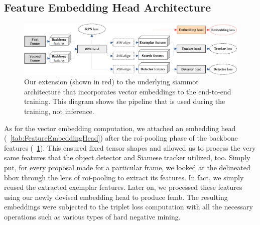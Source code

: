 \subsection{Feature Embedding Head Architecture}

\begin{figure}[!t]
    \centering
    \includegraphics[width=\linewidth]{figures/siamese_tracking/siammot_feature_emb_training.pdf}
    \caption[Embedding-enhanced \gls{siammot} architecture]{Our extension (shown in red) to the underlying \gls{siammot} architecture that incorporates vector embeddings to the end-to-end training. This diagram shows the pipeline that is used during the training, not inference.}
    \label{fig:SiamMOTWithEmbeddings}
\end{figure}

As for the vector embedding computation, we attached an embedding head (\tabletext{}~\ref{tab:FeatureEmbeddingHead}) after the \gls{roi}-pooling phase of the backbone features (\figtext{}~\ref{fig:SiamMOTWithEmbeddings}). This ensured fixed tensor shapes and allowed us to process the very same features that the object detector and Siamese tracker utilized, too. Simply put, for every proposal made for a particular frame, we looked at the delineated \gls{bbox} through the lens of \gls{roi}-pooling to extract its features. In fact, we simply reused the extracted exemplar features. Later on, we processed these features using our newly devised embedding head to produce \gls{femb}. The resulting embeddings were subjected to the triplet loss computation with all the necessary operations such as various types of hard negative mining.

